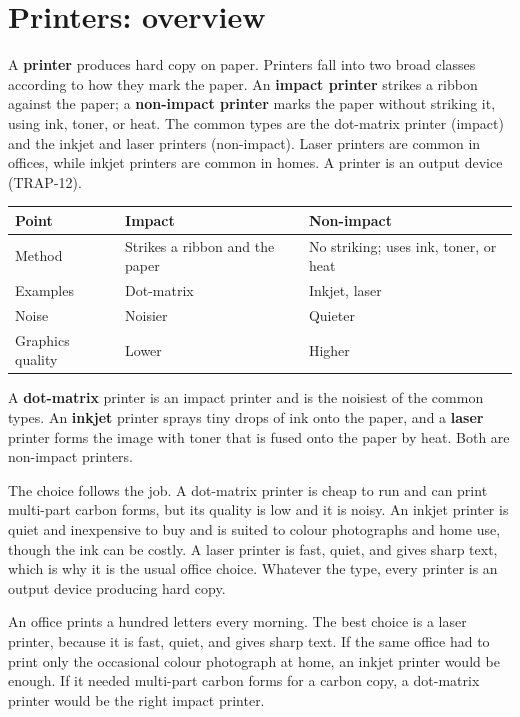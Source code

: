 \section{Printers: overview}
A \textbf{printer} produces hard copy on paper. Printers fall into two broad
classes according to how they mark the paper. An \textbf{impact printer}
strikes a ribbon against the paper; a \textbf{non-impact printer} marks the
paper without striking it, using ink, toner, or heat. The common types are the
dot-matrix printer (impact) and the inkjet and laser printers (non-impact).
Laser printers are common in offices, while inkjet printers are common in
homes. A printer is an output device (TRAP-12).

\begin{center}
\begin{tabular}{p{}p{}p{}}
\toprule
\textbf{Point} & \textbf{Impact} & \textbf{Non-impact} \\
\midrule
Method & Strikes a ribbon and the paper & No striking; uses ink, toner, or heat \\
Examples & Dot-matrix & Inkjet, laser \\
Noise & Noisier & Quieter \\
Graphics quality & Lower & Higher \\
\bottomrule
\end{tabular}
\end{center}

A \textbf{dot-matrix} printer is an impact printer and is the noisiest of the
common types. An \textbf{inkjet} printer sprays tiny drops of ink onto the
paper, and a \textbf{laser} printer forms the image with toner that is fused
onto the paper by heat. Both are non-impact printers.

The choice follows the job. A dot-matrix printer is cheap to run and can print
multi-part carbon forms, but its quality is low and it is noisy. An inkjet
printer is quiet and inexpensive to buy and is suited to colour photographs
and home use, though the ink can be costly. A laser printer is fast, quiet,
and gives sharp text, which is why it is the usual office choice. Whatever the
type, every printer is an output device producing hard copy.

\begin{example}
An office prints a hundred letters every morning. The best choice is a laser
printer, because it is fast, quiet, and gives sharp text. If the same office
had to print only the occasional colour photograph at home, an inkjet printer
would be enough. If it needed multi-part carbon forms for a carbon copy, a
dot-matrix printer would be the right impact printer.
\end{example}

